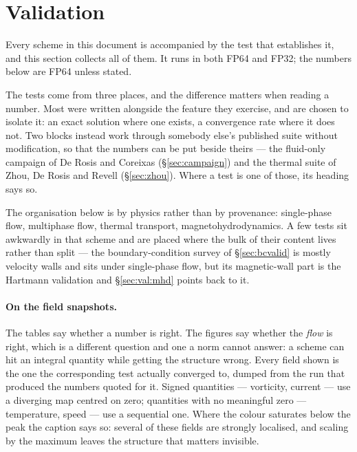 \documentclass[11pt,a4paper]{article}
\begin{document}
\section{Validation}
\label{sec:validation}

Every scheme in this document is accompanied by the test that establishes it,
and this section collects all of them. It runs in both FP64 and FP32; the
numbers below are FP64 unless stated.

The tests come from three places, and the difference matters when reading a
number. Most were written alongside the feature they exercise, and are chosen to
isolate it: an exact solution where one exists, a convergence rate where it does
not. Two blocks instead work through somebody else's published suite without
modification, so that the numbers can be put beside theirs --- the fluid-only
campaign of De Rosis and Coreixas (\S\ref{sec:campaign}) and the thermal suite of
Zhou, De Rosis and Revell (\S\ref{sec:zhou}). Where a test is one of those, its
heading says so.

The organisation below is by physics rather than by provenance: single-phase
flow, multiphase flow, thermal transport, magnetohydrodynamics. A few tests sit
awkwardly in that scheme and are placed where the bulk of their content lives
rather than split --- the boundary-condition survey of \S\ref{sec:bcvalid} is
mostly velocity walls and sits under single-phase flow, but its magnetic-wall
part is the Hartmann validation and \S\ref{sec:val:mhd} points back to it.

\paragraph{On the field snapshots.} The tables say whether a number is right.
The figures say whether the \emph{flow} is right, which is a different question
and one a norm cannot answer: a scheme can hit an integral quantity while
getting the structure wrong. Every field shown is the one the corresponding test
actually converged to, dumped from the run that produced the numbers quoted for
it. Signed quantities --- vorticity, current --- use a diverging map centred on
zero; quantities with no meaningful zero --- temperature, speed --- use a
sequential one. Where the colour saturates below the peak the caption says so:
several of these fields are strongly localised, and scaling by the maximum
leaves the structure that matters invisible.

\end{document}
